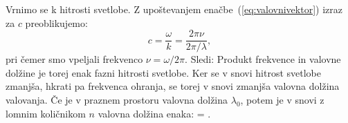
Vrnimo se k hitrosti svetlobe. Z upoštevanjem enačbe~(\ref{eq:valovnivektor})
izraz za $c$ preoblikujemo:
\begin{equation}
 c = \frac{\omega}{k} = \frac{2 \pi \nu}{2 \pi/\lambda},
 \label{eq:03_17}
\end{equation}
pri čemer smo vpeljali frekvenco $\nu = \omega/2\pi$. 
Sledi:
Produkt frekvence in valovne dolžine je torej enak fazni hitrosti svetlobe. Ker 
se v snovi hitrost svetlobe zmanjša, hkrati pa frekvenca ohranja, se torej 
v snovi zmanjša valovna dolžina valovanja. Če je v praznem prostoru valovna dolžina
$\lambda_0$, potem je v snovi z lomnim količnikom $n$ valovna dolžina enaka:
\beq
\lambda = .
\label{eq:03_18}
\eeq

